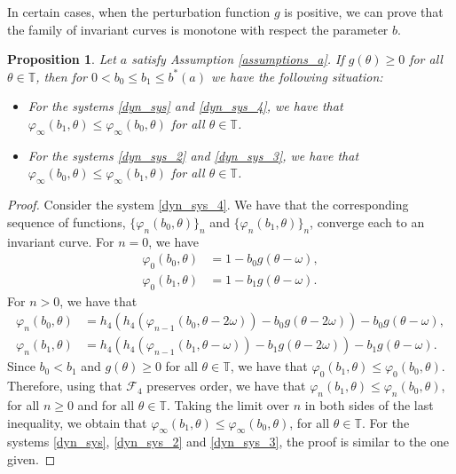 \documentclass[12pt]{article}
\newcommand{\T}{\mathbb{T}}
\theoremstyle{plain}
\newtheorem{prop}[defn]{Proposition}
\theoremstyle{remark}
\theoremstyle{definition}
\begin{document}
In certain cases, when the perturbation function $g$ is positive, we can prove that the family of invariant curves is monotone with respect the parameter $b$.
\begin{prop}\label{monotonic_sequence_limit}
    Let $a$ satisfy Assumption \eqref{assumptions_a}. If $g(\theta)\geq0$ for all $\theta\in\T$, then for $0<b_0\leq b_1\leq b^*(a)$ we have the following situation:
    \begin{itemize}
        \item For the systems \eqref{dyn_sys} and \eqref{dyn_sys_4}, we have that $\varphi_\infty(b_1,\theta)\leq\varphi_\infty(b_0,\theta)$ for all $\theta\in\T$.
        \item For the systems \eqref{dyn_sys_2} and \eqref{dyn_sys_3}, we have that $\varphi_\infty(b_0,\theta)\leq\varphi_\infty(b_1,\theta)$ for all $\theta\in\T$.
    \end{itemize}
\end{prop}
\begin{proof}
    Consider the system \eqref{dyn_sys_4}. We have that the corresponding sequence of functions, $\{\varphi_{n}(b_0,\theta)\}_n$ and $\{\varphi_{n}(b_1,\theta)\}_n$, converge each to an invariant curve. For $n=0$, we have
    \begin{align*}
        \varphi_{0}(b_0,\theta) &= 1 - b_0 g(\theta-\omega),\\
        \varphi_{0}(b_1,\theta) &= 1 - b_1 g(\theta-\omega).
    \end{align*}
    For $n>0$, we have that
    \begin{align*}
        \varphi_{n}(b_0,\theta) &= h_4(h_{4}(\varphi_{n-1}(b_0,\theta-2\omega)) - b_0 g(\theta-2\omega)) - b_0 g(\theta-\omega),\\
        \varphi_{n}(b_1,\theta) &= h_4(h_{4}(\varphi_{n-1}(b_1,\theta-\omega)) - b_1 g(\theta-2\omega)) - b_1 g(\theta-\omega).
    \end{align*}
    Since $b_0<b_1$ and $g(\theta)\geq0$ for all $\theta\in\T$, we have that $\varphi_{0}(b_1,\theta) \leq \varphi_{0}(b_0,\theta)$. Therefore, using that $\mathcal{F}_{4}$ preserves order, we have that $\varphi_{n}(b_1,\theta) \leq \varphi_{n}(b_0,\theta)$, for all $n\geq0$ and for all $\theta\in\T$. Taking the limit over $n$ in both sides of the last inequality, we obtain that $\varphi_\infty(b_1,\theta)\leq\varphi_\infty(b_0,\theta)$, for all $\theta\in\T$. For the systems \eqref{dyn_sys}, \eqref{dyn_sys_2} and \eqref{dyn_sys_3}, the proof is similar to the one given.
\end{proof}
\end{document}
